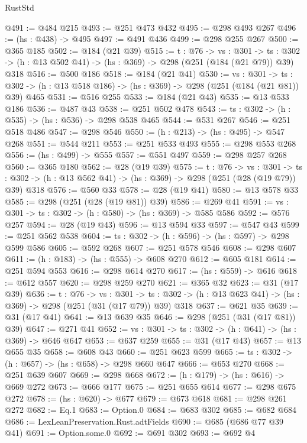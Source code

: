 \begin{lexlean}{RustStd}
\begin{coremodule}
{\begin{coremodule}
{@491 := @484 @215
@493 := @251 @473 @432
@495 := @298 @493 @267
@496 := (hs : @438) -> @495
@497 := @491 @436
@499 := @298 @255 @267
@500 := @365 @185
@502 := @184 (@21 @39)
@515 := {t : @76} ->
  {vs : @301} ->
  {ts : @302} -> (h : @13 @502 @41) -> (hs : @369) -> @298 (@251 (@184 (@21 @79)) @39) @318
@516 := @500 @186
@518 := @184 (@21 @41)
@530 := {vs : @301} ->
  {ts : @302} -> (h : @13 @518 @186) -> (hs : @369) -> @298 (@251 (@184 (@21 @81)) @39) @465
@531 := @516 @255
@533 := @184 (@21 @43)
@535 := @13 @533 @186
@536 := @487 @43
@538 := @251 @502 @478
@543 := {ts : @302} -> (h : @535) -> (hs : @536) -> @298 @538 @465
@544 := @531 @267
@546 := @251 @518 @486
@547 := @298 @546
@550 := (h : @213) -> (hs : @495) -> @547 @268
@551 := @544 @211
@553 := @251 @533 @493
@555 := @298 @553 @268
@556 := (hs : @499) -> @555
@557 := @551 @497
@559 := @298 @257 @268
@560 := @365 @180
@562 := @28 (@19 @39)
@575 := {t : @76} ->
  {vs : @301} ->
  {ts : @302} -> (h : @13 @562 @41) -> (hs : @369) -> @298 (@251 (@28 (@19 @79)) @39) @318
@576 := @560 @33
@578 := @28 (@19 @41)
@580 := @13 @578 @33
@585 := @298 (@251 (@28 (@19 @81)) @39)
@586 := @269 @41
@591 := {vs : @301} -> {ts : @302} -> (h : @580) -> (hs : @369) -> @585 @586
@592 := @576 @257
@594 := @28 (@19 @43)
@596 := @13 @594 @33
@597 := @547 @43
@599 := @251 @562 @538
@604 := {ts : @302} -> (h : @596) -> (hs : @597) -> @298 @599 @586
@605 := @592 @268
@607 := @251 @578 @546
@608 := @298 @607
@611 := (h : @183) -> (hs : @555) -> @608 @270
@612 := @605 @181
@614 := @251 @594 @553
@616 := @298 @614 @270
@617 := (hs : @559) -> @616
@618 := @612 @557
@620 := @298 @259 @270
@621 := @365 @32
@623 := @31 (@17 @39)
@636 := {t : @76} ->
  {vs : @301} ->
  {ts : @302} -> (h : @13 @623 @41) -> (hs : @369) -> @298 (@251 (@31 (@17 @79)) @39) @318
@637 := @621 @35
@639 := @31 (@17 @41)
@641 := @13 @639 @35
@646 := @298 (@251 (@31 (@17 @81)) @39)
@647 := @271 @41
@652 := {vs : @301} -> {ts : @302} -> (h : @641) -> (hs : @369) -> @646 @647
@653 := @637 @259
@655 := @31 (@17 @43)
@657 := @13 @655 @35
@658 := @608 @43
@660 := @251 @623 @599
@665 := {ts : @302} -> (h : @657) -> (hs : @658) -> @298 @660 @647
@666 := @653 @270
@668 := @251 @639 @607
@669 := @298 @668
@672 := (h : @179) -> (hs : @616) -> @669 @272
@673 := @666 @177
@675 := @251 @655 @614
@677 := @298 @675 @272
@678 := (hs : @620) -> @677
@679 := @673 @618
@681 := @298 @261 @272
@682 := Eq.{1}
@683 := Option.{0}
@684 := @683 @302
@685 := @682 @684
@686 := LexLeanPreservation.Rust.adtFields
@690 := @685 (@686 @77 @39 @41)
@691 := Option.some.{0}
@692 := @691 @302
@693 := @692 @4
}
\end{coremodule}}
\end{coremodule}
\end{lexlean}
